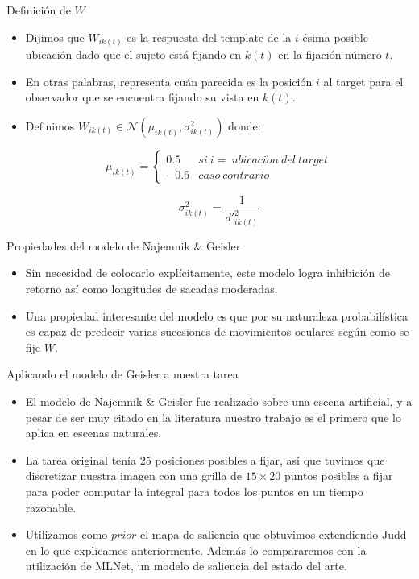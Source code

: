 \documentclass[compress]{beamer}
\begin{document}
\begin{frame}{Definición de $W$}
\begin{itemize}
\item Dijimos que $W_{ik(t)}$ es la respuesta del template de la $i$-ésima posible ubicación dado que el sujeto está fijando en $k(t)$ en la fijación número $t$. 

\item En otras palabras, representa cuán parecida es la posición $i$ al target para el observador que se encuentra fijando su vista en $k(t)$. 
\item Definimos $W_{ik(t)} \in \mathcal{N}(\mu_{ik(t)}, \sigma^2_{ik(t)})$ donde:

$$ \mu_{ik(t)}
= \left\{ \begin{array}{lc}
             0.5 &  si \ i = \ ubicaci\acute{o}n \ del \ target \\
             -0.5 &  caso \ contrario 
          \end{array}
   \right.$$

$$ \sigma^2_{ik(t)} = \displaystyle\frac{1}{d'^2_{ik(t)}}$$ 
\end{itemize}
\end{frame}

\begin{frame}{Propiedades del modelo de Najemnik \& Geisler}
\begin{itemize}
\item Sin necesidad de colocarlo explícitamente, este modelo logra inhibición de retorno así como longitudes de sacadas moderadas. 
\item Una propiedad interesante del modelo es que por su naturaleza probabilística es capaz de predecir varias sucesiones de movimientos oculares según como se fije $W$.
\end{itemize}
\end{frame}

\begin{frame}{Aplicando el modelo de Geisler a nuestra tarea}
\begin{itemize}
\item El modelo de Najemnik \& Geisler fue realizado sobre una escena artificial, y a pesar de ser muy citado en la literatura nuestro trabajo es el primero que lo aplica en escenas naturales. 
\item La tarea original tenía 25 posiciones posibles a fijar, así que tuvimos que discretizar nuestra imagen con una grilla de $15 \times 20$ puntos posibles a fijar para poder computar la integral para todos los puntos en un tiempo razonable.
\item Utilizamos como $prior$ el mapa de saliencia que obtuvimos extendiendo Judd en lo que explicamos anteriormente. Además lo compararemos con la utilización de MLNet, un modelo de saliencia del estado del arte.
\end{itemize}
\end{frame}
\end{document}
